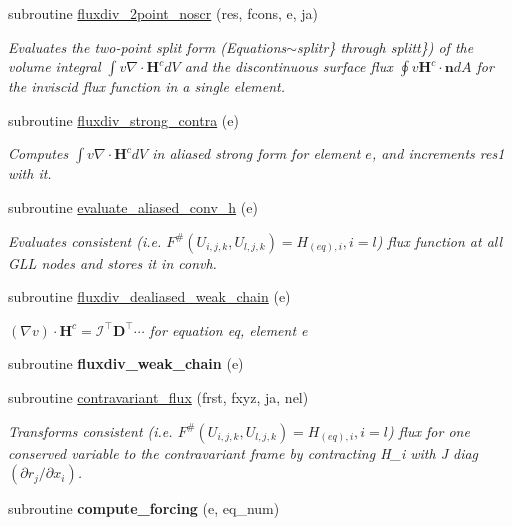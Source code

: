 \begin{DoxyCompactItemize}
\item 
subroutine \hyperlink{group__convhvol_ga72c1cbe51bc537e14ec8927e62f0e3f3}{fluxdiv\-\_\-2point\-\_\-noscr} (res, fcons, e, ja)
\begin{DoxyCompactList}\small\item\em Evaluates the two-\/point split form (Equations$\sim$splitr\} through splitt\}) of the volume integral $\int v \nabla\cdot\mathbf{H}^c dV$ and the discontinuous surface flux $\oint v \mathbf{H}^c\cdot\mathbf{n} dA$ for the inviscid flux function in a single element. \end{DoxyCompactList}\item 
subroutine \hyperlink{group__convhvol_gab4831bb28a78e1c8fd3ec09854bd15ad}{fluxdiv\-\_\-strong\-\_\-contra} (e)
\begin{DoxyCompactList}\small\item\em Computes $\int v \nabla\cdot\mathbf{H}^c dV$ in aliased strong form for element $e$, and increments res1 with it. \end{DoxyCompactList}\item 
subroutine \hyperlink{group__convhvol_gad9d70d83f1184d25495812d637698102}{evaluate\-\_\-aliased\-\_\-conv\-\_\-h} (e)
\begin{DoxyCompactList}\small\item\em Evaluates consistent (i.\-e. $F^{\#}(U_{i,j,k},U_{l,j,k})=H_{(eq),i},i=l$) flux function at all G\-L\-L nodes and stores it in convh. \end{DoxyCompactList}\item 
\hypertarget{group__convhvol_ga89ba8fe53f8afc523597773aca62a270}{subroutine \hyperlink{group__convhvol_ga89ba8fe53f8afc523597773aca62a270}{fluxdiv\-\_\-dealiased\-\_\-weak\-\_\-chain} (e)}\label{group__convhvol_ga89ba8fe53f8afc523597773aca62a270}

\begin{DoxyCompactList}\small\item\em $(\nabla v)\cdot \mathbf{H}^c=\mathcal{I}^{\intercal}\mathbf{D}^{\intercal}\cdots$ for equation eq, element e \end{DoxyCompactList}\item 
\hypertarget{eqnsolver__cmt_8f_a67c37779e77c6d9a630d38fe92314c23}{subroutine {\bfseries fluxdiv\-\_\-weak\-\_\-chain} (e)}\label{eqnsolver__cmt_8f_a67c37779e77c6d9a630d38fe92314c23}

\item 
subroutine \hyperlink{group__convhvol_ga72103225babeca7679ef8b9a41d08f2e}{contravariant\-\_\-flux} (frst, fxyz, ja, nel)
\begin{DoxyCompactList}\small\item\em Transforms consistent (i.\-e. $F^{\#}(U_{i,j,k},U_{l,j,k})=H_{(eq),i},i=l$) flux for one conserved variable to the contravariant frame by contracting H\-\_\-i with J diag $\left(\partial r_j/\partial x_i\right)$. \end{DoxyCompactList}\item 
\hypertarget{eqnsolver__cmt_8f_a16ab9195e1b629e65603f74643f877bb}{subroutine {\bfseries compute\-\_\-forcing} (e, eq\-\_\-num)}\label{eqnsolver__cmt_8f_a16ab9195e1b629e65603f74643f877bb}


\end{DoxyCompactItemize}
